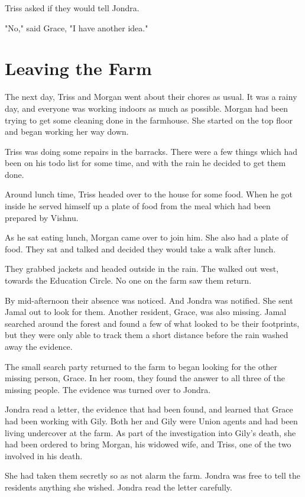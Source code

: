 \documentclass[courier]{sffms}
\begin{document}
Triss asked if they would tell Jondra.

"No," said Grace, "I have another idea."

\chapter{Leaving the Farm}
The next day, Triss and Morgan went about
their chores as usual. It was a rainy day, and
everyone was working indoors as much as
possible. Morgan had been trying to get some
cleaning done in the farmhouse. She started on
the top floor and began working her way down.

Triss was doing some repairs in the barracks.
There were a few things which had been on
his todo list for some time, and with the rain
he decided to get them done.

Around lunch time, Triss headed over to the
house for some food. When he got inside he
served himself up a plate of food from the
meal which had been prepared by Vishnu.

As he sat eating lunch, Morgan came over to
join him. She also had a plate of food. They
sat and talked and decided they would take 
a walk after lunch.

They grabbed jackets and headed outside
in the rain. The walked out west, towards the
Education Circle. No one on the farm saw them
return.

By mid-afternoon their absence was noticed.
And Jondra was notified. She sent Jamal out
to look for them. Another resident, Grace, was
also missing. Jamal searched around the forest
and found a few of what looked to be their
footprints, but they were only able to track them
a short distance before the rain washed away 
the evidence.

The small search party returned to the farm to
began looking for the other missing person,
Grace. In her room, they found the answer to
all three of the missing people. The evidence
was turned over to Jondra.

Jondra read a letter, the evidence that had 
been found, and learned that Grace had been
working with Gily. Both her and Gily were Union
agents and had been living undercover at the farm.
As part of the investigation into Gily's death, she
had been ordered to bring Morgan, his widowed
wife, and Triss, one of the two involved in his
death.

She had taken them secretly so as not alarm the
farm. Jondra was free to tell the residents anything
she wished. Jondra read the letter carefully.
\end{document}
